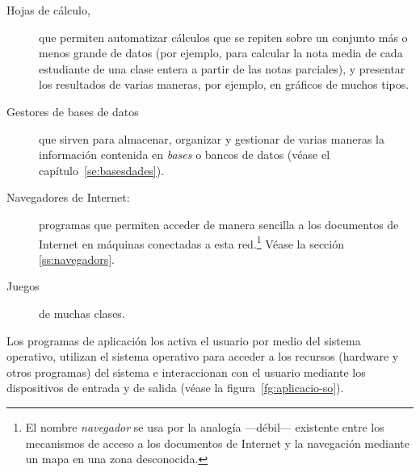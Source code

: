 \begin{description}
\begin{description}
\begin{description}
\item[Hojas de cálculo,] que permiten automatizar cálculos que se repiten sobre un conjunto más o menos grande de datos (por ejemplo, para calcular la nota media de cada estudiante de una clase entera a partir de las notas parciales), y presentar los resultados de varias maneras, por ejemplo, en gráficos de muchos tipos. \item[Gestores de bases de datos] \label{pg:BD} que sirven para almacenar, organizar y gestionar de varias maneras la información contenida en \emph{bases} o bancos de datos (véase el capítulo~\ref{se:basesdades}). 

\item[Navegadores de Internet:] \label{pg:navegadors} programas que permiten acceder de manera sencilla a los documentos de Internet en máquinas conectadas a esta red.\footnote{El nombre \emph{navegador} se usa por la analogía ---débil--- existente entre los mecanismos de acceso a los documentos de Internet y la navegación mediante un mapa en una zona desconocida.} Véase la sección \ref{ss:navegadors}. 

\item[Juegos] de muchas clases. \end{description} \end{description} Los programas de aplicación los activa el usuario por medio del sistema operativo, utilizan el sistema operativo para acceder a los recursos (hardware y otros programas) del sistema e interaccionan con el usuario mediante los dispositivos de entrada y de salida (véase la figura~\ref{fg:aplicacio-so}). \end{description} 

